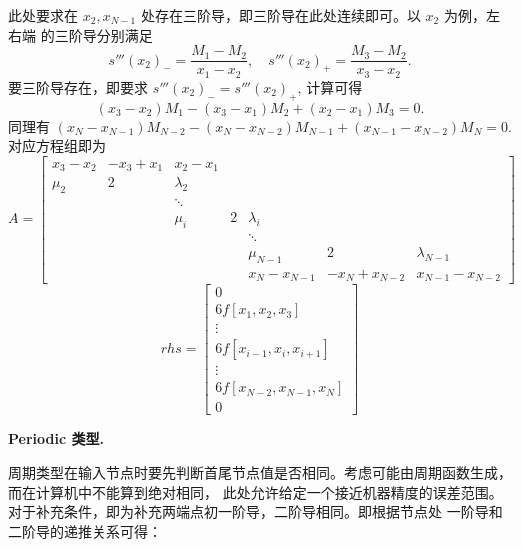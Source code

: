 \documentclass[a4paper]{article}
\begin{document}
此处要求在 $x_2,x_{N-1}$ 处存在三阶导，即三阶导在此处连续即可。以 $x_2$ 为例，左右端
的三阶导分别满足
$$
    s'''(x_2)_- = \frac{M_1 - M_2}{x_1 - x_2}, \quad
    s'''(x_2)_+ = \frac{M_3 - M_2}{x_3 - x_2}.
$$
要三阶导存在，即要求 $s'''(x_2)_- = s'''(x_2)_+$, 计算可得
$$
(x_3 - x_2)M_1 - (x_3 - x_1) M_2 + (x_2 - x_1) M_3 = 0.
$$
同理有 $(x_N - x_{N-1})M_{N-2} - (x_{N} - x_{N-2}) M_{N-1} + (x_{N-1} - x_{N-2}) M_N = 0.$
对应方程组即为
\begin{equation*}
A = \left[
\begin{matrix}
        x_3-x_2 & -x_3+x_1 & x_2-x_1 & & & & \\
        \mu_2 & 2 & \lambda_2 & & & & \\
        & & \ddots & & & & \\
        & & \mu_i & 2 & \lambda_i & & \\
        & & & & \ddots & & \\
        & & & & \mu_{N-1} & 2 & \lambda_{N-1} \\
        & & & & x_{N}-x_{N-1} & -x_{N}+x_{N-2} & x_{N-1}-x_{N-2}
\end{matrix}
\right]
\end{equation*}
\begin{equation*}
rhs = \left[
\begin{matrix}
        0 \\ 6f[x_1,x_2,x_3] \\ \vdots \\
        6f[x_{i-1},x_i,x_{i+1}] \\ \vdots \\ 6f[x_{N-2},x_{N-1},x_N] \\
        0
\end{matrix}
\right]
\end{equation*}

\bigskip
\noindent \textbf{Periodic 类型.}

周期类型在输入节点时要先判断首尾节点值是否相同。考虑可能由周期函数生成，而在计算机中不能算到绝对相同，
此处允许给定一个接近机器精度的误差范围。对于补充条件，即为补充两端点初一阶导，二阶导相同。即根据节点处
一阶导和二阶导的递推关系可得：
\end{document}
